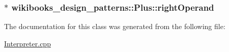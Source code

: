 \subsubsection[{\texorpdfstring{right\+Operand}{rightOperand}}]{$\ast$ wikibooks\+\_\+design\+\_\+patterns\+::\+Plus\+::right\+Operand\hspace{0.3cm}{\ttfamily [private]}}\hypertarget{classwikibooks__design__patterns_1_1Plus_a8b54c7b23f28495c095b0d3e146094ea}{}\label{classwikibooks__design__patterns_1_1Plus_a8b54c7b23f28495c095b0d3e146094ea}


The documentation for this class was generated from the following file\+:\begin{DoxyCompactItemize}
\item 
\hyperlink{Interpreter_8cpp}{Interpreter.\+cpp}\end{DoxyCompactItemize}
